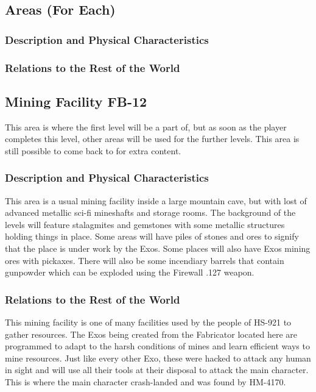 \documentclass[12pt]{article}
\begin{document}
\subsection{Areas (For Each)}

\subsubsection{Description and Physical Characteristics}

\subsubsection{Relations to the Rest of the World}

\subsection{Mining Facility FB-12}

This area is where the first level will be a part of, but as soon as the player completes this level, other areas will be used for the further levels. This area is still possible to come back to for extra content. 

\subsubsection{Description and Physical Characteristics}

This area is a usual mining facility inside a large mountain cave, but with lost of advanced metallic sci-fi mineshafts and storage rooms. The background of the levels will feature stalagmites and gemstones with some metallic structures holding things in place. Some areas will have piles of stones and ores to signify that the place is under work by the Exos. Some places will also have Exos mining ores with pickaxes. There will also be some incendiary barrels that contain gunpowder which can be exploded using the Firewall .127 weapon. 

\subsubsection{Relations to the Rest of the World}

This mining facility is one of many facilities used by the people of HS-921 to gather resources. The Exos being created from the Fabricator located here are programmed to adapt to the harsh conditions of mines and learn efficient ways to mine resources. Just like every other Exo, these were hacked to attack any human in sight and will use all their tools at their disposal to attack the main character. This is where the main character crash-landed and was found by HM-4170.
\end{document}
